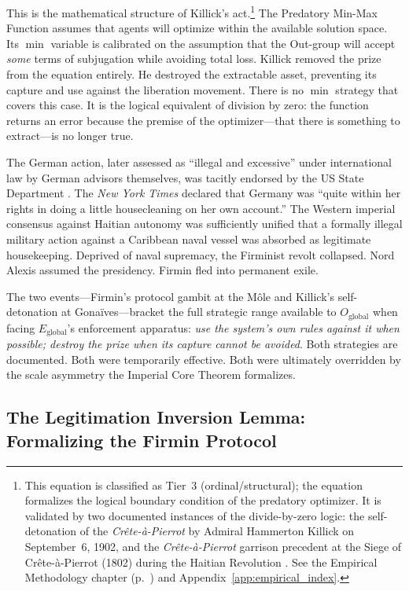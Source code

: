 This is the mathematical structure of Killick's act.\footnote{This equation is classified as Tier~3 (ordinal/structural); the equation formalizes the logical boundary condition of the predatory optimizer. It is validated by two documented instances of the divide-by-zero logic: the self-detonation of the \textit{Cr\^{e}te-\`{a}-Pierrot} by Admiral Hammerton Killick on September~6, 1902, and the \textit{Cr\^{e}te-\`{a}-Pierrot} garrison precedent at the Siege of Cr\^{e}te-\`{a}-Pierrot (1802) during the Haitian Revolution \cite{firmin_legacy}. See the Empirical Methodology chapter (p.~\pageref{ch:empirical_methodology}) and Appendix~\ref{app:empirical_index}.} The Predatory Min-Max Function assumes that agents will optimize within the available solution space. Its $\min$ variable is calibrated on the assumption that the Out-group will accept \textit{some} terms of subjugation while avoiding total loss. Killick removed the prize from the equation entirely. He destroyed the extractable asset, preventing its capture and use against the liberation movement. There is no $\min$ strategy that covers this case. It is the logical equivalent of division by zero: the function returns an error because the premise of the optimizer---that there is something to extract---is no longer true.

The German action, later assessed as ``illegal and excessive'' under international law by German advisors themselves, was tacitly endorsed by the US State Department \cite{firmin_legacy}. The \textit{New York Times} declared that Germany was ``quite within her rights in doing a little housecleaning on her own account.'' The Western imperial consensus against Haitian autonomy was sufficiently unified that a formally illegal military action against a Caribbean naval vessel was absorbed as legitimate housekeeping. Deprived of naval supremacy, the Firminist revolt collapsed. Nord Alexis assumed the presidency. Firmin fled into permanent exile.

The two events---Firmin's protocol gambit at the M\^{o}le and Killick's self-detonation at Gona\"{i}ves---bracket the full strategic range available to $O_{\text{global}}$ when facing $E_{\text{global}}$'s enforcement apparatus: \textit{use the system's own rules against it when possible; destroy the prize when its capture cannot be avoided}. Both strategies are documented. Both were temporarily effective. Both were ultimately overridden by the scale asymmetry the Imperial Core Theorem formalizes.

\subsection{The Legitimation Inversion Lemma: Formalizing the Firmin Protocol}

